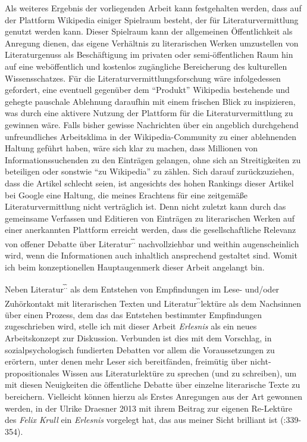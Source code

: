 \documentclass[fontsize=12pt]{scrartcl}
\begin{document}
Als weiteres Ergebnis der vorliegenden Arbeit kann festgehalten werden, dass auf der Plattform Wi\-ki\-pe\-dia einiger Spielraum be\-steht, der f\"ur Li\-te\-ra\-tur\-ver\-mitt\-lung genutzt werden kann. Dieser Spielraum kann der allgemeinen \"Of\-fent\-lichkeit als Anre\-gung die\-nen, das eigene Verh\"altnis zu li\-te\-ra\-rischen Werken umzustellen von Li\-te\-ra\-tur\-genuss als Besch\"aftigung im privaten oder semi-\"of\-fent\-lichen Raum hin auf eine web\"of\-fent\-lich und kostenlos zug\"ang\-liche Bereicherung des kulturellen Wis\-sens\-schat\-zes. F\"ur die Li\-te\-ra\-tur\-ver\-mitt\-lungsfor\-schung w\"are infolgedessen gefordert, eine eventuell gegen\"uber dem "`Produkt"' Wi\-ki\-pe\-dia bestehende und gehegte pauschale Ablehnung daraufhin mit einem frischen Blick zu inspizieren, was durch eine aktivere Nutzung der Platt\-form f\"ur die Li\-te\-ra\-tur\-ver\-mitt\-lung zu gewinnen w\"are. Falls bis\-her gewisse Nach\-rich\-ten \"uber ein angeblich durchgehend unfreundliches Arbeitsklima in der Wi\-ki\-pe\-dia-Community zu einer ablehnenden Haltung gef\"uhrt haben, w\"are sich klar zu machen, dass Millionen von Informationssuchenden zu den Eintr\"agen gelangen, ohne sich an Streitigkei\-ten zu beteiligen oder sonstwie "`zu Wi\-ki\-pe\-dia"' zu z\"ahlen. Sich darauf zur\"uckzuziehen, dass die Artikel schlecht seien, ist angesichts des hohen Rankings dieser Artikel bei Google eine Haltung, die meines Erachtens f\"ur eine zeitgem\"a{\ss}e Li\-te\-ra\-tur\-ver\-mitt\-lung nicht vertr\"aglich ist. Denn nicht zu\-letzt kann durch das gemeinsame Verfassen und Editieren von Eintr\"agen zu li\-te\-ra\-rischen Werken auf einer anerkannten Plattform erreicht werden, dass die ge\-sell\-schaftliche Relevanz von offener Debatte \"uber Li\-te\-ra\-tur\textsuperscript{\~.\~.} nachvollziehbar und weithin augenscheinlich wird, wenn die Informationen auch inhaltlich ansprechend gestaltet sind. Womit ich beim konzeptionellen Hauptaugenmerk dieser Arbeit angelangt bin.

Neben Li\-te\-ra\-tur\textsuperscript{\~.\~.} als dem Entstehen von Emp\-fin\-dun\-gen im Lese- und/oder Zuh\"or\-kontakt mit li\-te\-ra\-rischen Texten und Li\-te\-ra\-tur\textsuperscript{\~.\~.}lekt\"ure als dem Nachsinnen \"uber einen Prozess, dem das das Entstehen bestimmter Emp\-fin\-dun\-gen zugeschrieben wird, stelle ich mit dieser Arbeit \textit{Erlesnis} als ein neues Arbeits\-konzept zur Dis\-kus\-si\-on. Verbunden ist dies mit dem Vorschlag, in sozialpsychologisch fundierten Debatten vor allem die Voraussetzungen zu er\"ortern, unter denen mehr Leser\textsuperscript{\tiny *} sich bereitf\"anden, freim\"utig \"uber nicht-pro\-po\-si\-ti\-o\-na\-les Wissen aus Li\-te\-ra\-tur\-lekt\"ure zu sprechen (und zu schrei\-ben), um mit diesen Neuigkei\-ten die \"of\-fent\-liche Debatte \"uber einzelne li\-te\-ra\-rische Texte zu bereichern. Vielleicht k\"onnen hierzu als Erstes Anregungen aus der Art gewonnen werden, in der Ulrike Draesner 2013 mit ihrem Beitrag zur eigenen Re-Lekt\"ure des \textit{Felix Krull} ein \textit{Erlesnis} vorgelegt hat, das aus meiner Sicht brilliant ist (\cite{Draesner2013}:339-354).
\end{document}
